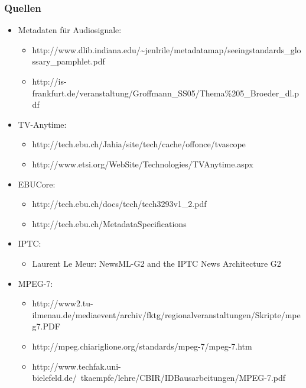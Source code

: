 \documentclass[14pt]{beamer}
\begin{document}
\begin{frame}
	\frametitle{Quellen}
	\begin{itemize}
	\item Metadaten für Audiosignale:
	
	\begin{itemize}
	\item http://www.dlib.indiana.edu/\textasciitilde jenlrile/metadatamap/seeingstandards\_glossary\_pamphlet.pdf
	\item  http://is-frankfurt.de/veranstaltung/Groffmann\_SS05/Thema\%205\_Broeder\_dl.pdf
	\end{itemize}
	
	\item TV-Anytime:
	
	\begin{itemize}
	\item  http://tech.ebu.ch/Jahia/site/tech/cache/offonce/tvascope
	\item http://www.etsi.org/WebSite/Technologies/TVAnytime.aspx
	\end{itemize}
	
	\item EBUCore:
	
	\begin{itemize}
	\item  http://tech.ebu.ch/docs/tech/tech3293v1\_2.pdf
	\item http://tech.ebu.ch/MetadataSpecifications
	\end{itemize}
	
	\item IPTC:
	
	\begin{itemize}
		\item Laurent Le Meur: NewsML-G2 and the IPTC News Architecture G2
	\end{itemize} 
	\item MPEG-7:
		\begin{itemize}
			\item http://www2.tu-ilmenau.de/mediaevent/archiv/fktg/regionalveranstaltungen/Skripte/mpeg7.PDF
			\item http://mpeg.chiariglione.org/standards/mpeg-7/mpeg-7.htm
			\item http://www.techfak.uni-bielefeld.de/~tkaempfe/lehre/CBIR/IDBausarbeitungen/MPEG-7.pdf

			
		\end{itemize}
		
	\end{itemize}


\end{frame}
\end{document}
